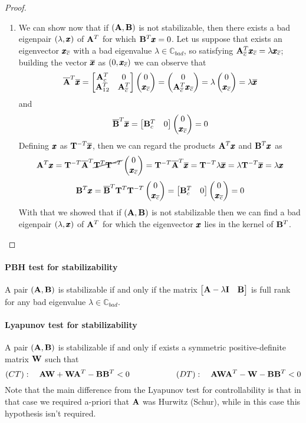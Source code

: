 \begin{proof}
\begin{enumerate}[\itshape a)]
		\item We can show now that if $(\mathbf{A},\mathbf{B})$ is not stabilizable, then there exists a bad eigenpair $(\lambda,\pmb{x})$ of $\mathbf{A}^T$ for which $\mathbf{B}^T\pmb{x} = 0$. Let us suppose that exists  an eigenvector $\pmb{x}_{\overline c}$ with a bad eigenvalue $\lambda \in \mathds C_{bad}$, so satisfying $\mathbf{A}_{\overline c}^T \pmb{x}_{\overline c} = \lambda \pmb{x}_{\overline c}$; building the vector $\overline {\pmb{x}}$ as $(0, \pmb{x}_{\overline c})$ we can observe that
		\[ \overline {\mathbf{A}}^T \overline {\pmb{x}} = \begin{bmatrix} \mathbf{A}_c^T & 0 \\ \mathbf{A}_{12}^T & \mathbf{A}_{\overline c}^T \end{bmatrix} \begin{pmatrix} 0 \\ \pmb{x}_{\overline c} \end{pmatrix} = \begin{pmatrix} 0 \\ \mathbf{A}_{\overline c}^T\pmb{x}_{\overline c} \end{pmatrix} = \lambda \begin{pmatrix} 0 \\ \pmb{x}_{\overline c} \end{pmatrix} = \lambda \overline {\pmb{x}}  \]
		and
		\[ \overline {\mathbf{B}}^T\overline {\pmb{x}} = \begin{bmatrix} \mathbf{B}_c^T & 0 \end{bmatrix} \begin{pmatrix} 0 \\ \pmb{x}_{\overline c} \end{pmatrix} = 0 \]
		Defining $\pmb{x}$ as $\mathbf{T}^{-T}\overline {\pmb{x}}$, then we can regard the products $\mathbf{A}^T\pmb{x}$ and $\mathbf{B}^T\pmb{x}$ as
		\[ \mathbf{A}^T \pmb{x} = \mathbf{T}^{-T}\overline {\mathbf{A}}^T \cancel{\mathbf{T}^T\mathbf{T}^{-T}} \begin{pmatrix} 0 \\ \pmb{x}_{\overline c} \end{pmatrix} = \mathbf{T}^{-T}\overline {\mathbf{A}}^T \overline {\pmb{x}} = \mathbf{T}^{-T}\lambda \overline {\pmb{x}} = \lambda \mathbf{T}^{-T}\overline {\pmb{x}} = \lambda \pmb{x} \]
		\[ \mathbf{B}^T\pmb{x} = \overline {\mathbf{B}}^T\mathbf{T}^T\mathbf{T}^{-T}\begin{pmatrix} 0 \\ \pmb{x}_{\overline c} \end{pmatrix} = \begin{bmatrix} \mathbf{B}_c^T & 0 \end{bmatrix} \begin{pmatrix} 0 \\ \pmb{x}_{\overline c} \end{pmatrix} = 0 \]
		With that we showed that if $(\mathbf{A},\mathbf{B})$ is not stabilizable then we can find a bad eigenpair $(\lambda,\pmb{x})$ of $\mathbf{A}^T$ for which the eigenvector $\pmb{x}$ lies in the kernel of $\mathbf{B}^T$.
	\end{enumerate}
	\end{proof}
	
	\paragraph{PBH test for stabilizability} A pair $(\mathbf{A},\mathbf{B})$ is stabilizable if and only if the matrix $\begin{bmatrix} \mathbf{A}-\lambda \mathbf{I} & \mathbf{B} \end{bmatrix}$ is full rank for any bad eigenvalue $\lambda \in \mathds C_{bad}$.

	\paragraph{Lyapunov test for stabilizability} A pair $(\mathbf{A},\mathbf{B})$ is stabilizable if and only if exists a symmetric positive-definite matrix $\mathbf{W}$ such that
	\begin{equation} \label{eq:kal:temp1}
		(CT): \quad \mathbf{A}\mathbf{W} + \mathbf{W} \mathbf{A}^T - \mathbf{B}\mathbf{B}^T < 0 \hspace{2cm} (DT):\quad \mathbf{A}\mathbf{W}\mathbf{A}^T - \mathbf{W} - \mathbf{B}\mathbf{B}^T < 0
	\end{equation}
	Note that the main difference from the Lyapunov test for controllability is that in that case we required a-priori that $\mathbf{A}$ was Hurwitz (Schur), while in this case this hypothesis isn't required.
	
